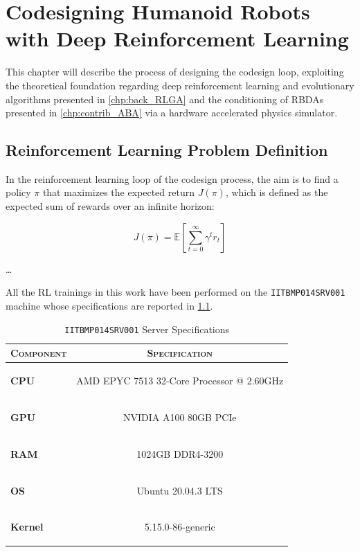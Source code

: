 \chapter{Codesigning Humanoid Robots with Deep Reinforcement Learning}
\label{chp:contrib_CodesignRL}

This chapter will describe the process of designing the codesign loop, exploiting the theoretical foundation regarding deep reinforcement learning and evolutionary algorithms presented in \cref{chp:back_RLGA} and the conditioning of \ac{RBDA}s presented in \cref{chp:contrib_ABA} via a hardware accelerated physics simulator.

\section{Reinforcement Learning Problem Definition}

In the reinforcement learning loop of the codesign process, the aim is to find a policy $\pi$ that maximizes the expected return $J(\pi)$, which is defined as the expected sum of rewards over an infinite horizon:

\begin{equation}
    J(\pi) = \mathbb{E} \left[ \sum_{t=0}^{\infty} \gamma ^t r_t \right]
\end{equation}

\dots

All the \ac{RL} trainings in this work have been performed on the \texttt{IITBMP014SRV001} machine whose specifications are reported in \cref{tab:rl_machine}.

\begin{table}[h]
    \centering
    \label{tab:rl_machine}
    \caption{\texttt{IITBMP014SRV001} Server Specifications}
    \begin{tabular}[h]{l c}
        \toprule
        \textsc{Component} & \textsc{Specification}                                            \\
        \midrule
        \textbf{CPU}       & \begin{small}AMD EPYC 7513 32-Core Processor @ 2.60GHz\end{small} \\
        \textbf{GPU}       & \begin{small}NVIDIA A100 80GB PCIe                    \end{small} \\
        \textbf{RAM}       & \begin{small}1024GB DDR4-3200                         \end{small} \\
        \textbf{OS}        & \begin{small}Ubuntu 20.04.3 LTS                       \end{small} \\
        \textbf{Kernel}    & \begin{small}5.15.0-86-generic                        \end{small} \\
        \bottomrule
    \end{tabular}
\end{table}


